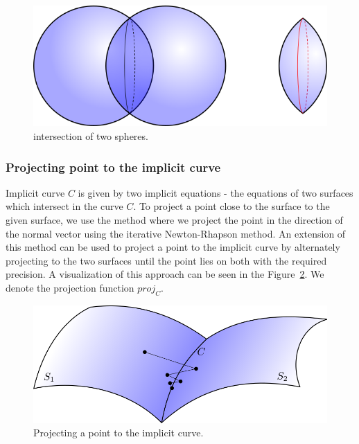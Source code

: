 \begin{figure}
    \centerline{\includegraphics[scale=0.5]{images/img35}}
    \caption[Intersection of a two spheres]
    {intersection of two spheres.}
    \label{img:35}
\end{figure}

\subsubsection{Projecting point to the implicit curve}

Implicit curve $C$ is given by two implicit equations - the equations of two surfaces
which intersect in the curve $C$.
To project a point close to the surface to the given surface, we use the method where
we project the point in the direction of the normal vector using the iterative 
Newton-Rhapson method. An extension of this method can be used to project a point
to the implicit curve by alternately projecting to the two surfaces until the
point lies on both with the required precision. A visualization of this approach can be
seen in the Figure~\ref{img:36}. We denote the projection function $proj_C$.

\begin{figure}
    \centerline{\includegraphics[scale=0.5]{images/img36}}
    \caption[Projecting a point to the implicit curve]
    {Projecting a point to the implicit curve.}
    \label{img:36}
\end{figure}

